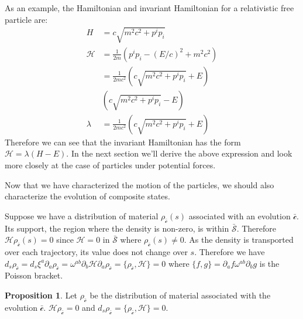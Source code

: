 \documentclass[aps,pra,10pt,twocolumn,floatfix,nofootinbib]{revtex4-1}
\numberwithin{equation}{section}
\theoremstyle{definition}
\newtheorem{prop}[equation]{Proposition}
\begin{document}
As an example, the Hamiltonian and invariant Hamiltonian for a relativistic free particle are:
\begin{equation}\label{free_hamiltonians}
\begin{aligned}
H &= c \sqrt{m^2 c^2 + p^i p_i} \\
\mathcal{H} &= \frac{1}{2m} ( p^i p_i - (E/c)^2 + m^2c^2) \\
 &= \frac{1}{2mc^2} (c \sqrt{m^2 c^2 + p^i p_i} + E) \\
 &(c \sqrt{m^2 c^2 + p^i p_i} - E) \\
\lambda &= \frac{1}{2mc^2} (c \sqrt{m^2 c^2 + p^i p_i} + E)
\end{aligned}
\end{equation}
Therefore we can see that the invariant Hamiltonian has the form $\mathcal{H}=\lambda (H - E)$. In the next section we'll derive the above expression and look more closely at the case of particles under potential forces.

Now that we have characterized the motion of the particles, we should also characterize the evolution of composite states.

Suppose we have a distribution of material $\rho_{\bar{\mathcal{c}}}(s)$ associated with an evolution $\bar{\mathcal{c}}$. Its support, the region where the density is non-zero, is within $\bar{\mathcal{S}}$. Therefore  $\mathcal{H} \rho_{\bar{\mathcal{c}}}(s) = 0$ since $\mathcal{H} = 0$ in $\bar{\mathcal{S}}$ where $\rho_{\bar{\mathcal{c}}}(s) \neq 0$. As the density is transported over each trajectory, its value does not change over $s$. Therefore we have $d_s \rho_{\bar{\mathcal{c}}}= d_s \xi^a \partial_a \rho_{\bar{\mathcal{c}}} = \omega^{ab} \partial_b \mathcal{H} \partial_a \rho_{\bar{\mathcal{c}}} = \{ \rho_{\bar{\mathcal{c}}}, \mathcal{H} \} = 0$ where $\{f , g\} = \partial_a f \omega^{ab} \partial_b g$ is the Poisson bracket.

\begin{prop}\label{prop:relativistic_state_evolution}
	Let $\rho_{\bar{\mathcal{c}}}$ be the distribution of material associated with the evolution $\bar{\mathcal{c}}$. $\mathcal{H} \rho_{\bar{\mathcal{c}}} = 0$ and $d_s \rho_{\bar{\mathcal{c}}} = \{ \rho_{\bar{\mathcal{c}}}, \mathcal{H} \} = 0$.
\end{prop}
\end{document}
